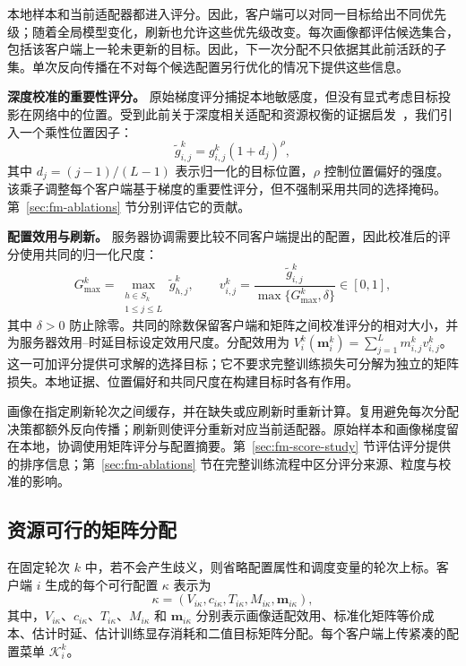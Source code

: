 \documentclass[10pt,conference,letterpaper]{IEEEtran}
\begin{document}
本地样本和当前适配器都进入评分。因此，客户端可以对同一目标给出不同优先级；随着全局模型变化，刷新也允许这些优先级改变。每次画像都评估候选集合，包括该客户端上一轮未更新的目标。因此，下一次分配不只依据其此前活跃的子集。单次反向传播在不对每个候选配置另行优化的情况下提供这些信息。

\noindent\textbf{深度校准的重要性评分。}
原始梯度评分捕捉本地敏感度，但没有显式考虑目标投影在网络中的位置。受到此前关于深度相关适配和资源权衡的证据启发~\cite{liu2025legend}，我们引入一个乘性位置因子：
\begin{equation}
 \widetilde g_{i,j}^k=g_{i,j}^k(1+d_j)^{\rho},
 \label{eq:depth}
\end{equation}
其中 $d_j=(j-1)/(L-1)$ 表示归一化的目标位置，$\rho$ 控制位置偏好的强度。该乘子调整每个客户端基于梯度的重要性评分，但不强制采用共同的选择掩码。第~\ref{sec:fm-ablations} 节分别评估它的贡献。

\noindent\textbf{配置效用与刷新。}
服务器协调需要比较不同客户端提出的配置，因此校准后的评分使用共同的归一化尺度：
\begin{equation}
 G_{\max}^k=\max_{\substack{h\in S_k\\1\le j\le L}}\widetilde g_{h,j}^k,
 \qquad v_{i,j}^k=
 \frac{\widetilde g_{i,j}^k}{\max\{G_{\max}^k,\delta\}}\in[0,1],
 \label{eq:normalization}
\end{equation}
其中 $\delta>0$ 防止除零。共同的除数保留客户端和矩阵之间校准评分的相对大小，并为服务器效用--时延目标设定效用尺度。分配效用为
$V_i^k(\mathbf m_i^k)=\sum_{j=1}^{L}m_{i,j}^kv_{i,j}^k$。
这一可加评分提供可求解的选择目标；它不要求完整训练损失可分解为独立的矩阵损失。本地证据、位置偏好和共同尺度在构建目标时各有作用。

画像在指定刷新轮次之间缓存，并在缺失或应刷新时重新计算。复用避免每次分配决策都额外反向传播；刷新则使评分重新对应当前适配器。原始样本和画像梯度留在本地，协调使用矩阵评分与配置摘要。第~\ref{sec:fm-score-study} 节评估评分提供的排序信息；第~\ref{sec:fm-ablations} 节在完整训练流程中区分评分来源、粒度与校准的影响。

\subsection{资源可行的矩阵分配}\label{sec:fm-allocation}
在固定轮次 \(k\) 中，若不会产生歧义，则省略配置属性和调度变量的轮次上标。客户端 \(i\) 生成的每个可行配置 \(\kappa\) 表示为
\[
\kappa=(V_{i\kappa},c_{i\kappa},T_{i\kappa},M_{i\kappa},\mathbf m_{i\kappa}),
\]
其中，\(V_{i\kappa}\)、\(c_{i\kappa}\)、\(T_{i\kappa}\)、\(M_{i\kappa}\) 和 \(\mathbf m_{i\kappa}\) 分别表示画像适配效用、标准化矩阵等价成本、估计时延、估计训练显存消耗和二值目标矩阵分配。每个客户端上传紧凑的配置菜单 \(\mathcal K_i^k\)。
\end{document}
